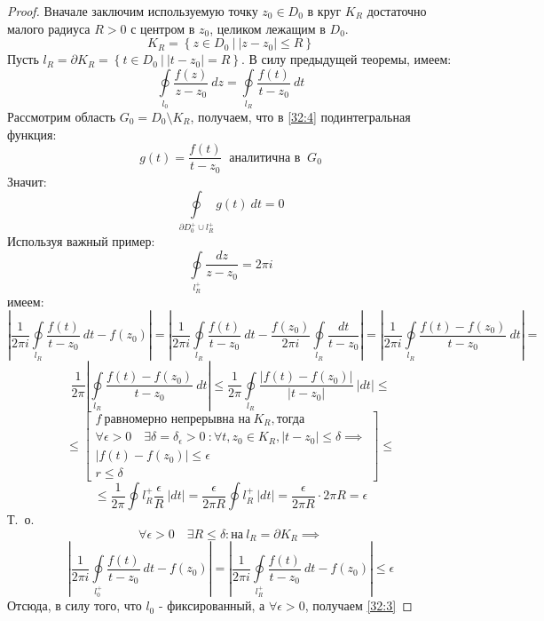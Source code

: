 \documentclass[../../main.tex]{subfiles}
\begin{document}
\begin{proof}
	Вначале заключим используемую точку $z_0 \in D_0$ в круг $K_R$ достаточно малого радиуса $R>0$ с центром в $z_0$, целиком лежащим в $D_0$.
	\[ K_R = \left\lbrace z \in D_0 \ \big| \ |z-z_0| \le R\right\rbrace  \]
	Пусть $l_R = \partial K_R = \left\lbrace t \in D_0 \ \big| \ |t-z_0| = R \right\rbrace $. В силу предыдущей теоремы, имеем:
	\begin{equation}
	\label{32:4}
	\oint \limits_{l_0} \frac{f(z)}{z-z_0} \ dz = \oint \limits_{l_R} \frac{f(t)}{t-z_0} \ dt
	\end{equation}
	Рассмотрим область $G_0 = D_0 \setminus K_R$, получаем, что в \eqref{32:4} подинтегральная функция:
	\[ g(t) = \frac{f(t)}{t-z_0} \ \text{ аналитична в } \ G_0 \]
	Значит:
	\[ \oint \limits_{\partial D_0^{+} \cup l_{R}^{+} }  g(t) \ dt = 0   \]
	Используя важный пример:
	\[  \oint \limits_{ l_{R}^{+} }  \frac{dz}{z-z_0} = 2 \pi i    \]
	имеем:
	\[     \left| \frac{1}{2 \pi i} \oint \limits_{l_R} \frac{f(t)}{t-z_0} \ dt - f(z_0)   \right| =  \left| \frac{1}{2 \pi i} \oint \limits_{l_R} \frac{f(t)}{t-z_0} \ dt - \frac{f(z_0)}{2 \pi i} \oint \limits_{l_R} \frac{dt}{t-z_0}   \right| = \left| \frac{1}{2 \pi i} \oint \limits_{l_R} \frac{f(t) - f(z_0)}{t-z_0} \ dt  \right| = \]
	\[  \frac{1}{2 \pi }  \left| \oint \limits_{l_R} \frac{f(t) - f(z_0)}{t-z_0} \ dt \right| \le  \frac{1}{2 \pi } \oint \limits_{l_R} \frac{ \left|  f(t) - f(z_0) \right| }{ \left|  t-z_0   \right|   } \ \left| dt   \right| \le    \]
	\[  \le \left[ \begin{gathered}  
	f \ \text{равномерно непрерывна на} \ K_R, \text{тогда} \\
	\forall \epsilon >0 \quad \exists \delta = \delta_{\epsilon} > 0 \ : \forall t,z_0 \in K_R, |t-z_0| \le \delta  \implies\\
	|f(t) - f(z_0)| \le \epsilon \\
	r \le \delta
	\end{gathered}\right] \le   \]
	\[ \le \frac{1}{2\pi} \oint \limits{l_R^{+}} \frac{\epsilon}{R} \ |dt| = \frac{\epsilon}{2 \pi R } \oint \limits{l_R^{+}} \ |dt| = \frac{\epsilon}{2 \pi R } \cdot 2 \pi R = \epsilon     \]
	Т.~о. 
	\[  \forall \epsilon > 0 \quad \exists R \le \delta : \text{на} \ l_R = \partial K_R \implies        \]
	\[ \left| \frac{1}{2 \pi i} \oint \limits_{l_0^+} \frac{f(t)}{t-z_0} \ dt - f(z_0) \right| = \left| \frac{1}{2 \pi i} \oint \limits_{l_R^+} \frac{f(t)}{t-z_0} \ dt - f(z_0) \right| \le \epsilon    \]
	Отсюда, в силу того,  что $l_0$ -  фиксированный, а $\forall \epsilon > 0$, получаем \eqref{32:3}
\end{proof}	
\end{document}
